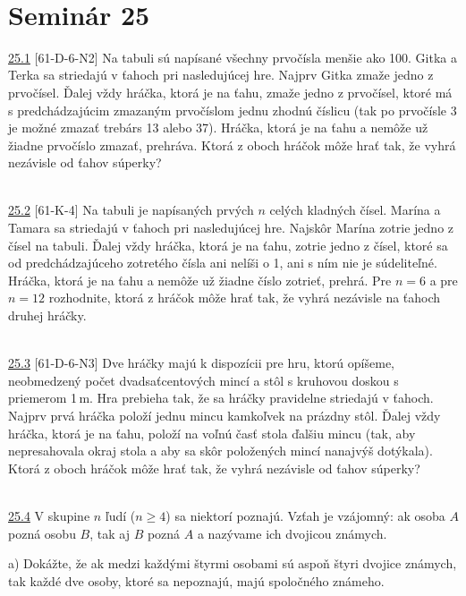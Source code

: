 \\

\section*{Seminár 25}

\noindent \ul{25.1} [61-D-6-N2] Na tabuli sú napísané všechny prvočísla menšie ako 100. Gitka a Terka sa striedajú v ťahoch pri nasledujúcej hre. Najprv Gitka zmaže jedno z prvočísel. Ďalej vždy hráčka, ktorá je na ťahu, zmaže jedno z prvočísel, ktoré má s predchádzajúcim zmazaným prvočíslom jednu zhodnú číslicu (tak po prvočísle 3 je možné zmazať trebárs 13 alebo 37). Hráčka, ktorá je na ťahu a nemôže už žiadne prvočíslo zmazať, prehráva. Ktorá z oboch hráčok môže hrať tak, že vyhrá nezávisle od ťahov súperky?


\\

\noindent \ul{25.2} [61-K-4] Na tabuli je napísaných prvých $n$ celých kladných čísel. Marína a Tamara sa striedajú v ťahoch pri nasledujúcej hre. Najskôr Marína zotrie jedno z čísel na tabuli. Ďalej vždy hráčka, ktorá je na ťahu, zotrie jedno z čísel, ktoré sa od predchádzajúceho zotretého čísla ani nelíši o 1, ani s ním nie je súdeliteľné. Hráčka, ktorá je na ťahu a nemôže už žiadne číslo zotrieť, prehrá. Pre $n = 6$ a pre $n = 12$ rozhodnite, ktorá z hráčok môže hrať tak, že vyhrá nezávisle na ťahoch druhej hráčky.


\\

\noindent \ul{25.3} [61-D-6-N3] Dve hráčky majú k dispozícii pre hru, ktorú opíšeme, neobmedzený počet dvadsaťcentových mincí a stôl s kruhovou doskou s priemerom 1\,m. Hra prebieha tak, že sa hráčky pravidelne striedajú v ťahoch. Najprv prvá hráčka položí jednu mincu kamkoľvek na prázdny stôl. Ďalej vždy hráčka, ktorá je na ťahu, položí na voľnú časť stola ďalšiu mincu (tak, aby nepresahovala okraj stola a aby sa skôr položených mincí nanajvýš dotýkala). Ktorá z oboch hráčok môže hrať tak, že vyhrá nezávisle od ťahov súperky?


\\

\noindent \ul{25.4} V skupine $n$ ľudí ($n \geq 4$) sa niektorí poznajú. Vzťah  je vzájomný: ak osoba $A$ pozná osobu $B$, tak aj $B$ pozná $A$ a nazývame ich dvojicou známych.

a) Dokážte, že ak medzi každými štyrmi osobami sú aspoň štyri dvojice známych, tak každé dve osoby, ktoré sa nepoznajú, majú spoločného známeho.

